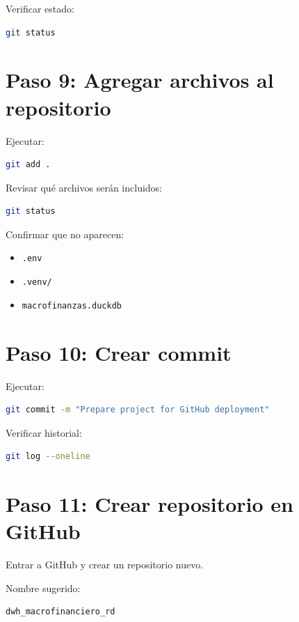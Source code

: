 Verificar estado:

\begin{lstlisting}[language=bash]
git status
\end{lstlisting}

\section{Paso 9: Agregar archivos al repositorio}

Ejecutar:

\begin{lstlisting}[language=bash]
git add .
\end{lstlisting}

Revisar qué archivos serán incluidos:

\begin{lstlisting}[language=bash]
git status
\end{lstlisting}

Confirmar que no aparecen:

\begin{itemize}
\item \texttt{.env}
\item \texttt{.venv/}
\item \texttt{macrofinanzas.duckdb}
\end{itemize}

\section{Paso 10: Crear commit}

Ejecutar:

\begin{lstlisting}[language=bash]
git commit -m "Prepare project for GitHub deployment"
\end{lstlisting}

Verificar historial:

\begin{lstlisting}[language=bash]
git log --oneline
\end{lstlisting}

\section{Paso 11: Crear repositorio en GitHub}

Entrar a GitHub y crear un repositorio nuevo.

Nombre sugerido:

\begin{verbatim}
dwh_macrofinanciero_rd
\end{verbatim}

